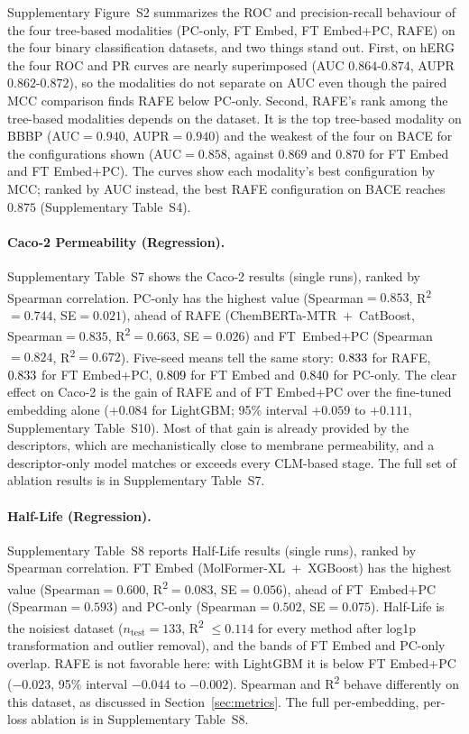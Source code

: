 \documentclass[pdflatex,sn-mathphys-num,Numbered]{sn-jnl}%
\begin{document}
Supplementary Figure~S2 summarizes the ROC and precision-recall behaviour of the four tree-based modalities (PC-only, FT Embed, FT Embed+PC, RAFE) on the four binary classification datasets, and two things stand out. First, on hERG the four ROC and PR curves are nearly superimposed (AUC $0.864$-$0.874$, AUPR $0.862$-$0.872$), so the modalities do not separate on AUC even though the paired MCC comparison finds RAFE below PC-only. Second, RAFE's rank among the tree-based modalities depends on the dataset. It is the top tree-based modality on BBBP (AUC$=0.940$, AUPR$=0.940$) and the weakest of the four on BACE for the configurations shown (AUC$=0.858$, against $0.869$ and $0.870$ for FT Embed and FT Embed+PC). The curves show each modality's best configuration by MCC; ranked by AUC instead, the best RAFE configuration on BACE reaches $0.875$ (Supplementary Table~S4). 


\FloatBarrier
\paragraph{Caco-2 Permeability (Regression).} Supplementary Table~S7 shows the Caco-2 results (single runs), ranked by Spearman correlation. PC-only has the highest value (Spearman$=0.853$, R\textsuperscript{2}$=0.744$, SE$=0.021$), ahead of RAFE (ChemBERTa-MTR~$+$~CatBoost, Spearman$=0.835$, R\textsuperscript{2}$=0.663$, SE$=0.026$) and FT~Embed+PC (Spearman$=0.824$, R\textsuperscript{2}$=0.672$). Five-seed means tell the same story: $0.833$ for RAFE, $0.833$ for FT Embed+PC, $0.809$ for FT Embed and $0.840$ for PC-only. The clear effect on Caco-2 is the gain of RAFE and of FT Embed+PC over the fine-tuned embedding alone ($+0.084$ for LightGBM; 95\% interval $+0.059$ to $+0.111$, Supplementary Table~S10). Most of that gain is already provided by the descriptors, which are mechanistically close to membrane permeability, and a descriptor-only model matches or exceeds every CLM-based stage. The full set of ablation results is in Supplementary Table~S7.

\paragraph{Half-Life (Regression).} Supplementary Table~S8 reports Half-Life results (single runs), ranked by Spearman correlation. FT Embed (MolFormer-XL~$+$~XGBoost) has the highest value (Spearman$=0.600$, R\textsuperscript{2}$=0.083$, SE$=0.056$), ahead of FT~Embed+PC (Spearman$=0.593$) and PC-only (Spearman$=0.502$, SE$=0.075$). Half-Life is the noisiest dataset ($n_\text{test}=133$, R\textsuperscript{2} $\le 0.114$ for every method after log1p transformation and outlier removal), and the bands of FT Embed and PC-only overlap. RAFE is not favorable here: with LightGBM it is below FT Embed+PC ($-0.023$, 95\% interval $-0.044$ to $-0.002$). Spearman and R\textsuperscript{2} behave differently on this dataset, as discussed in Section~\ref{sec:metrics}. The full per-embedding, per-loss ablation is in Supplementary Table~S8.
\end{document}
